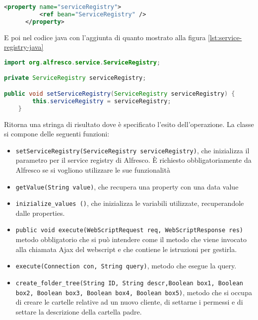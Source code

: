 \begin{lstlisting}[language=XML,label=lst:service-registry,caption=inclusione del service registry nel bean]
        <property name="serviceRegistry">
          <ref bean="ServiceRegistry" />
      </property>
\end{lstlisting}
E poi nel codice java con l’aggiunta di quanto mostrato alla figura \ref{lst:service-registry-java}
\begin{lstlisting}[language=Java,label=lst:service-registry-java,caption=inclusione del service registry nel bean]
import org.alfresco.service.ServiceRegistry;

private ServiceRegistry serviceRegistry;

public void setServiceRegistry(ServiceRegistry serviceRegistry) {
		this.serviceRegistry = serviceRegistry;
	}
\end{lstlisting}
Ritorna una stringa di risultato dove è specificato l’esito dell’operazione.
La classe si compone delle seguenti funzioni:
\begin{itemize}
\item \texttt{setServiceRegistry(ServiceRegistry serviceRegistry)}, che inizializza il parametro per il service registry di Alfresco. È richiesto obbligatoriamente da Alfresco se si vogliono utilizzare le sue funzionalità
\item \texttt{getValue(String value)}, che recupera una property con una data value
\item \texttt{inizialize\_values ()}, che inizializza le variabili utilizzate, recuperandole dalle properties.
\item \texttt{public void execute(WebScriptRequest req, WebScriptResponse res)} metodo obbligatorio che si può intendere come il metodo che viene invocato alla chiamata Ajax del webscript e che contiene le istruzioni per gestirla.
\item \texttt{execute(Connection con, String query)}, metodo che esegue la query.
\item \texttt{create\_folder\_tree(String ID, String descr,Boolean box1, Boolean box2, Boolean box3, Boolean box4, Boolean box5)}, metodo che si occupa di creare le cartelle relative ad un nuovo cliente, di settarne i permessi e di settare la descrizione della cartella padre.
\end{itemize}
